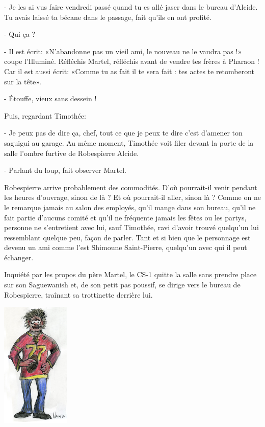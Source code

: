 - Je les ai vus faire vendredi passé quand tu es allé jaser dans le bureau d’Alcide. Tu avais laissé ta bécane dans le passage, fait qu’ils en ont profité.

- Qui ça ?

- Il est écrit: «N’abandonne pas un vieil ami, le nouveau ne le vaudra pas !» coupe l’Illuminé. Réfléchis Martel, réfléchis avant de vendre tes frères à Pharaon ! Car il est aussi écrit: «Comme tu as fait il te sera fait : tes actes te retomberont sur la tête».

- Étouffe, vieux sans dessein !

Puis, regardant Timothée:

- Je peux pas de dire ça, chef, tout ce que je peux te dire c’est d’amener ton saguigui au garage.
Au même moment, Timothée voit filer devant la porte de la salle l’ombre furtive de Robespierre Alcide.

- Parlant du loup, fait observer Martel.

Robespierre arrive probablement des commodités. D’où pourrait-il venir pendant les heures d’ouvrage, sinon de là ? Et où pourrait-il aller, sinon là ? Comme on ne le remarque jamais au salon des employés, qu’il mange dans son bureau, qu’il ne fait partie d’aucuns comité et qu’il ne fréquente jamais les fêtes ou les partys, personne ne s’entretient avec lui, sauf Timothée, ravi d’avoir trouvé quelqu’un lui ressemblant quelque peu, façon de parler. Tant et si bien que le personnage est devenu un ami comme l’est Shimoune Saint-Pierre, quelqu’un avec qui il peut échanger.

Inquiété par les propos du père Martel, le CS-1 quitte la salle sans prendre place sur son Saguewanish et, de son petit pas poussif, se dirige vers le bureau de Robespierre, traînant sa trottinette derrière lui.

\begin{floatingfigure}[r]{35mm}
\includegraphics[height=60mm]{corps/chapitre3/img/alcide.jpg}
\end{floatingfigure}

